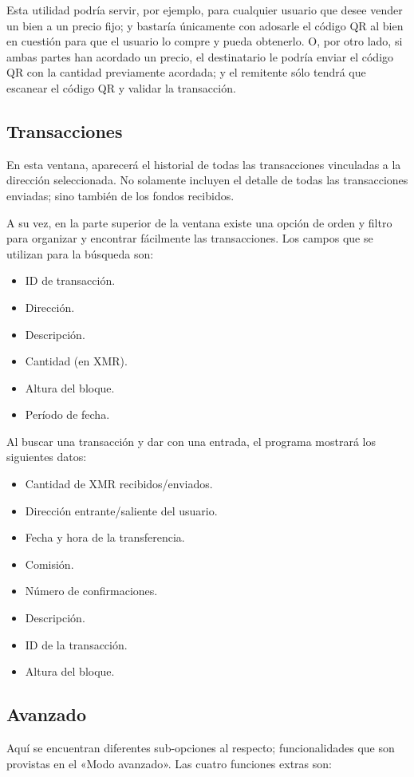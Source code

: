 \documentclass[12pt,a4paper,twoside]{book}
\begin{document}
Esta utilidad podría servir, por ejemplo, para cualquier usuario que desee vender un bien a un precio fijo; y bastaría únicamente con adosarle el código QR al bien en cuestión para que el usuario lo compre y pueda obtenerlo. O, por otro lado, si ambas partes han acordado un precio, el destinatario le podría enviar el código QR con la cantidad previamente acordada; y el remitente sólo tendrá que escanear el código QR y validar la transacción.

\subsection{Transacciones}
En esta ventana, aparecerá el historial de todas las transacciones vinculadas a la dirección seleccionada. No solamente incluyen el detalle de todas las transacciones enviadas; sino también de los fondos recibidos.

A su vez, en la parte superior de la ventana existe una opción de orden y filtro para organizar y encontrar fácilmente las transacciones. Los campos que se utilizan para la búsqueda son:

\begin{itemize}
\item ID de transacción.
\item Dirección.
\item Descripción.
\item Cantidad (en XMR).
\item Altura del bloque.
\item Período de fecha.
\end{itemize}

Al buscar una transacción y dar con una entrada, el programa mostrará los siguientes datos:

\begin{itemize}
\item Cantidad de XMR recibidos/enviados.
\item Dirección entrante/saliente del usuario.
\item Fecha y hora de la transferencia.
\item Comisión.
\item Número de confirmaciones.
\item Descripción.
\item ID de la transacción.
\item Altura del bloque.
\end{itemize}

\subsection{Avanzado}
Aquí se encuentran diferentes sub-opciones al respecto; funcionalidades que son provistas en el «Modo avanzado». Las cuatro funciones extras son:
\end{document}
